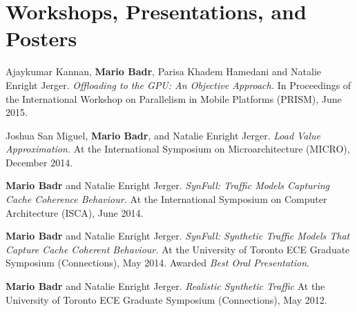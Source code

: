 \section{\sc Workshops, Presentations, and Posters}

{
  Ajaykumar Kannan, \textbf{Mario Badr}, Parisa Khadem Hamedani and Natalie Enright Jerger.
  \textit{Offloading to the GPU: An Objective Approach.}
  In Proceedings of the International Workshop on Parallelism in Mobile Platforms (PRISM), June 2015.
}

{
  Joshua San Miguel, \textbf{Mario Badr}, and Natalie Enright Jerger.
  \textit{Load Value Approximation.}
  At the International Symposium on Microarchitecture (MICRO), December 2014.
}

{
  \textbf{Mario Badr} and Natalie Enright Jerger.
  \textit{SynFull: Traffic Models Capturing Cache Coherence Behaviour.}
  At the International Symposium on Computer Architecture (ISCA), June 2014.
}

{
  \textbf{Mario Badr} and Natalie Enright Jerger.
  \textit{SynFull: Synthetic Traffic Models That Capture Cache Coherent Behaviour.}
  At the University of Toronto ECE Graduate Symposium (Connections), May 2014.
  Awarded \textit{Best Oral Presentation}.
}

{
  \textbf{Mario Badr} and Natalie Enright Jerger.
  \textit{Realistic Synthetic Traffic}
  At the University of Toronto ECE Graduate Symposium (Connections), May 2012.
}

